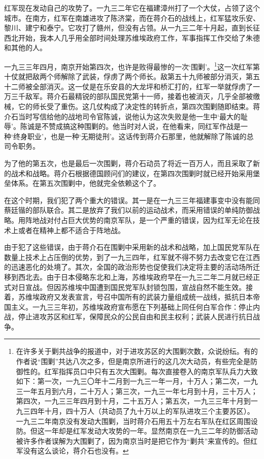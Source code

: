 \documentclass[10pt]{book}
\begin{document}
红军现在发动自己的攻势了。一九三二年它在福建漳州打了一个大仗，占领了这个城市。在南方，红军在南雄进攻了陈济棠，而在蒋介石的战线上，红军猛攻乐安、黎川、建宁和泰宁。它攻打了赣州，但没有占领。从一九三二年十月起，直到长征西北开始，我本人几乎用全部时间处理苏维埃政府工作，军事指挥工作交给了朱德和其他的人。

一九三三年四月，南京开始第四次，也许是败得最惨的一次‘围剿’。\footnote{在许多关于剿共战争的报道中，对于进攻苏区的大围剿次数，众说纷纭。有的作者说“围剿”共达八次之多，但是南京所进行的这几次大动员，有些完全是防御性的。红军指挥员口中只有五次大围剿。每次直接卷入的南京军队兵力大致如下：第一次，一九三〇年十二月到一九三一年一月，十万人；第二次，一九三一年五月到六月，二十万人；第三次，一九三一年七月到十月，三十万人；第四次，一九三三年四月到十月，二十五万人；第五次，一九三三年十月到一九三四年十月，四十万人（共动员了九十万以上的军队进攻三个主要苏区）。一九三二年南京没有发动大围剿，当时蒋介石用五十万左右军队在红区周围设防。但这一年却是红军发动大攻势的一年。显然南京在一九三二年的防御活动被许多作者误解为大围剿了，因为南京当时是把它作为“剿共”来宣传的。但红军没有这么谈论，蒋介石也没有。}这一次红军第十仗就把敌两个师解除了武装，俘虏了两个师长。敌第五十九师被部分消灭，第五十二师被全部消灭。这一仗是在乐安县的大龙坪和桥汇打的，红军一举就俘虏了一万三千敌军。蒋介石最精锐的部队国民党第十一师，接着也被消灭，几乎全部被缴械，它的师长受了重伤。这几仗构成了决定性的转折点，第四次围剿随即结束。蒋介石当时写信给他的战地司令官陈诚，说他认为这次失败是他一生中‘最大的耻辱’。陈诚是不赞成搞这种围剿的。他当时对人说，在他看来，同红军作战是一种‘终身职业’，也是一种‘无期徒刑’。这话传到蒋介石那里，他就解除了陈诚的总司令职务。

为了他的第五次，也是最后一次围剿，蒋介石动员了将近一百万人，而且采取了新的战术和战略。蒋介石根据德国顾问们的建议，在第四次围剿时就已经开始采用堡垒体系。在第五次围剿中，他就完全依赖这个了。

在这个时期，我们犯了两个重大的错误。其一是在一九三三年福建事变中没有能同蔡廷锴的部队联合。其二是放弃了我们以前的运动战术，而采用错误的单纯防御战略。用阵地战对付占巨大优势的南京军队，是一个严重的错误，因为红军无论在技术上或者在精神上都不适合于阵地战。

由于犯了这些错误，由于蒋介石在围剿中采用新的战术和战略，加上国民党军队在数量上技术上占压倒的优势，到了一九三四年，红军就不得不努力去改变它在江西的迅速恶化的处境了。其次，全国的政治形势也促使我们决定将主要的活动场所迁移到西北去。由于日本侵略东北和上海，苏维埃政府早在一九三二年二月就已经正式对日宣战。但因苏维埃中国遭到国民党军队封锁包围，宣战自然不能生效。接着，苏维埃政府又发表宣言，号召中国所有的武装力量组成统一战线，抵抗日本帝国主义。一九三三年初，苏维埃政府宣布愿在下列基础上同任何白军合作：停止内战，停止进攻苏区和红军，保障民众的公民自由和民主权利；武装人民进行抗日战争。
\end{document}
